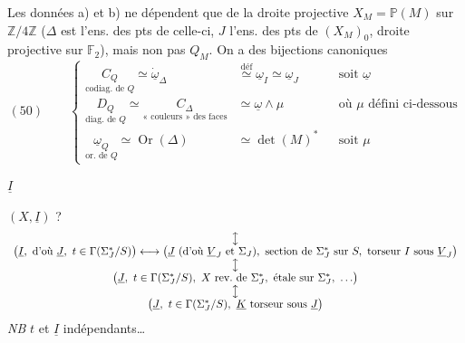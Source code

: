 \documentclass[11pt,a4paper]{article}
\begin{document}
Les données a) et b) ne dépendent que de la droite projective $X_M = \mathbb{P}(M)$ sur $\mathbb{Z}/4\mathbb{Z}$ ($\Delta$ est l'ens. des pts de celle-ci, $J$ l'ens. des pts de $(X_M)_0$, droite projective sur $\mathbb{F}_2$), mais non pas $Q_M$. On a des bijections canoniques
\[
  (50) \qquad
  \left\{
  \begin{array}{llll}
    \underset{\text{codiag.\ de } Q}{C_Q} \simeq \dot{\underline{\omega}}_\Delta & \overset{\mathrm{déf}}{\simeq} \underline{\omega}_I \simeq \underline{\omega}_J & & \text{soit } \underline{\omega} \\
    \underset{\text{diag.\ de } Q}{D_Q} \simeq \underset{\text{« couleurs » des faces}}{C_\Delta} & \simeq \underline{\omega} \wedge \mu & & \text{où } \mu \text{ défini ci-dessous} \\
    \underset{\text{or.\ de } Q}{\underline{\omega}_Q} \simeq \operatorname{Or}(\Delta) & \simeq \det(M)^* & & \text{soit } \mu
  \end{array}
  \right.
\]

$\underline{I}$ \ill{}

$(X, \underline{I})$ \struck{\ill{}} \ill{} \ill{} \ill{} \ill{} ?
\[
  \begin{array}{c}
    \big\updownarrow \\
    \bigl(\underline{I},\ \text{d'où } \underline{J},\ t \in \Gamma(\Sigma_J^*/S)\bigr) \longleftrightarrow \bigl(\underline{J}\ (\text{d'où } \underline{V}_J \text{ et } \Sigma_J),\ \text{section de } \Sigma_J^* \text{ sur } S,\ \text{torseur } I \text{ sous } \underline{V}_J\bigr) \\
    \big\updownarrow \\
    \bigl(\underline{J},\ t \in \Gamma(\Sigma_J^*/S),\ X \text{ rev.\ de } \Sigma_J^*,\ \text{étale sur } \Sigma_J^*,\ \ldots\bigr) \\
    \big\updownarrow \\
    \bigl(\underline{J},\ t \in \Gamma(\Sigma_J^*/S),\ \underline{K} \text{ torseur sous } \underline{J}\bigr)
  \end{array}
\]
\emph{NB} $t$ et $\underline{I}$ indépendants\ldots
\end{document}
